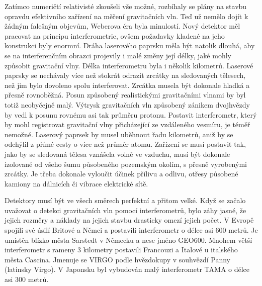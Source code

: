   Zatímco numeričtí relativisté zkoušeli vše možné, rozbíhaly se plány na stavbu opravdu efektivního
  zařízení na měření gravitačních vln. Teď už nemělo dojít k žádným falešným objevům, Weberova éra
  byla minulostí. Nový detektor měl pracovat na principu interferometrie, ovšem požadavky kladené na
  jeho konstrukci byly enormní. Dráha laserového paprsku měla být natolik dlouhá, aby se na
  interferenčním obrazci projevily i malé změny její délky, jaké mohly způsobit gravitační vlny.
  Délka interferometru byla i několik kilometrů. Laserové paprsky se nechávaly více než stokrát
  odrazit zrcátky na sledovaných tělesech, než jim bylo dovoleno spolu interferovat. Zrcátka musela
  být dokonale hladká a přesně rovnoběžná. Posun způsobený realistickými gravitačními vlnami by byl
  totiž neobyčejně malý. Výtrysk gravitačních vln způsobený zánikem dvojhvězdy by vedl k posunu
  rovnému asi tak průměru protonu. Postavit interferometr, který by mohl registrovat gravitační vlny
  přicházející ze vzdáleného vesmíru, je téměř nemožné. Laserový paprsek by musel uběhnout řadu
  kilometrů, aniž by se odchýlil z přímé cesty o více než průměr atomu. Zařízení se musí postavit
  tak, jako by se sledovaná tělesa vznášela volně ve vzduchu, musí být dokonale izolované od všeho
  šumu působeného pozemským okolím, s přesně vyrobenými zrcátky. Je třeba dokonale vyloučit účinek
  přílivu a odlivu, otřesy působené kamiony na dálnicích či vibrace elektrické sítě. 

  Detektory musí být ve všech směrech perfektní a přitom velké. Když se začalo uvažovat o detekci
  gravitačních vln pomocí interferometrů, bylo záhy jasné, že jejich rozměry a náklady na jejich
  stavbu drasticky omezí jejich počet. V Evropě spojili své úsilí Britové a Němci a postavili
  interferometr o délce asi 600 metrů. Je umístěn blízko města Sarstedt v Německu a nese jméno
  GEO600. Mnohem větší interferometr s rameny 3 kilometry postavili Francouzi a Italové u italského
  města Cascina. Jmenuje se VIRGO podle hvězdokupy v souhvězdí Panny (latinsky Virgo). V Japonsku
  byl vybudován malý interferometr TAMA o délce asi 300 metrů. 

